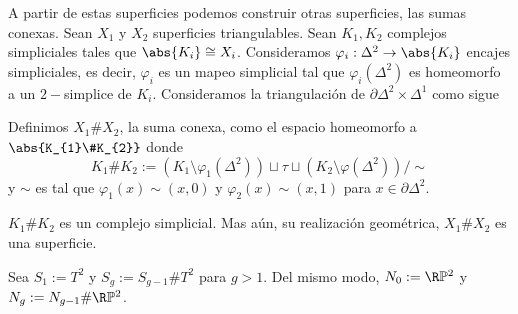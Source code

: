 \documentclass{article}
\begin{document}
\noindent A partir de estas superficies podemos construir otras superficies, las sumas conexas. 
Sean $X_{1}$ y $X_{2}$ superficies triangulables. Sean $K_{1},K_{2}$ complejos simpliciales tales
que $\abs{K_{i}}\cong X_{i}$. Consideramos $\varphi_{i}:\Delta^{2}\to \abs{K_{i}}$ encajes 
simpliciales, es decir, $\varphi_{i}$ es un mapeo simplicial tal que $\varphi_{i}(\Delta^{2})$ es 
homeomorfo a un $2-$simplice de $K_{i}$. Consideramos la triangulación de 
$\partial\Delta^{2}\times\Delta^{1}$ como sigue
\begin{center}
\end{center}
Definimos $X_{1}\#X_{2}$, la suma conexa, como el espacio homeomorfo a $\abs{K_{1}\#K_{2}}$ donde
\begin{equation*}
    K_{1}\#K_{2}:=(K_{1}\setminus\varphi_{1}(\Delta^{2}))\sqcup\tau
    \sqcup(K_{2}\setminus\varphi(\Delta^{2}))/\sim
\end{equation*}
y $\sim$ es tal que $\varphi_{1}(x)\sim(x,0)$ y $\varphi_{2}(x)\sim(x,1)$ para 
$x\in\partial\Delta^{2}$.

\vspace{2mm}
\begin{prop}
    $K_{1}\#K_{2}$ es un complejo simplicial. Mas aún, su realización geométrica, $X_{1}\#X_{2}$
    es una superficie.
\end{prop}

\vspace{2mm}
\begin{dfn}
    Sea $S_{1}:=T^{2}$ y $S_{g}:=S_{g-1}\#T^{2}$ para $g>1$. Del mismo modo, 
    $N_{0}:=\R\mathbb{P}^{2}$ y $N_{g}:=N_{g-1}\#\R\mathbb{P}^{2}$.
\end{dfn}
\end{document}
